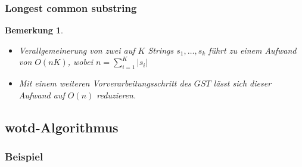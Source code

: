 \documentclass{beamer}
\newtheorem{remark}{Bemerkung}
\newcommand{\abs}[1]{\left|#1\right|}
\begin{document}
\begin{frame}
\frametitle{Longest common substring}
\begin{remark}
    \begin{itemize}
        \item Verallgemeinerung von zwei auf $K$ Strings $s_1, \dots, s_k$ führt zu einem Aufwand von $O(nK)$, wobei $n = \sum_{i = 1}^K \abs{s_i}$
        \item Mit einem weiteren Vorverarbeitungsschritt des $GST$ lässt sich dieser Aufwand auf $O(n)$ reduzieren.
    \end{itemize}
\end{remark}
\end{frame}




\subsection{wotd-Algorithmus}

\subsubsection{Beispiel}
\end{document}
